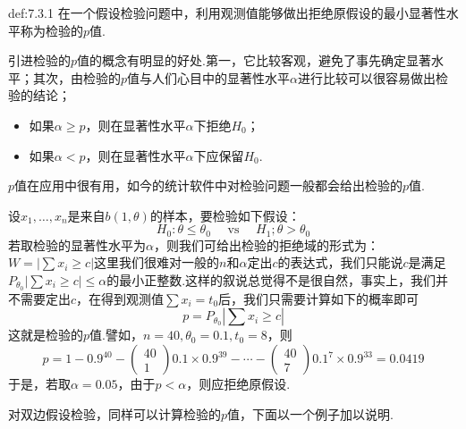 \begin{definition}{}{def:7.3.1}
	在一个假设检验问题中，利用观测值能够做出拒绝原假设的最小显著性水平称为检验的$p$值.
\end{definition}
引进检验的$p$值的概念有明显的好处.第一，它比较客观，避免了事先确定显著水平；其次，由检验的$p$值与人们心目中的显著性水平$\alpha$进行比较可以很容易做出检验的结论；
\begin{itemize}
	\item 如果$\alpha\geq p$，则在显著性水平$\alpha$下拒绝$H_{0}$；
	\item 如果$\alpha<p$，则在显著性水平$\alpha$下应保留$H_{0}$.
\end{itemize}
$p$值在应用中很有用，如今的统计软件中对检验问题一般都会给出检验的$p$值.
\begin{example}\label{exam7.3.6}
	设$x_{1},\dotsc,x_{n}$是来自$b(1,\theta)$的样本，要检验如下假设：
	\[H _ { 0 } : \theta \leq \theta _ { 0 } \quad \text { vs } \quad H _ { 1 } ; \theta > \theta _ { 0 }\]
	若取检验的显著性水平为$\alpha$，则我们可给出检验的拒绝域的形式为：$W=\left|\sum{x_i\geq c}\right|$这里我们很难对一般的$n$和$\alpha$定出$c$的表达式，我们只能说$c$是满足$P_{\theta_0}\left|\sum{x_i\geq c}\right|\leq\alpha $的最小正整数.这样的叙说总觉得不是很自然，事实上，我们并不需要定出$c$，在得到观测值$\sum x _ { i } = t _ { 0 }$后，我们只需要计算如下的概率即可
	\[
	p=P_{\theta_0}\left|\sum{x_i\geq c}\right|
	\]
	这就是检验的$p$值.譬如，$n=40,\theta_{ 0 }=0.1,t_{0}=8$，则
	\[p = 1 - 0.9 ^ { 40 } - \left( \begin{array} { c } { 40 } \\ { 1 } \end{array} \right) 0.1 \times 0.9 ^ { 39 } - \cdots - \left( \begin{array} { c } { 40 } \\ { 7 } \end{array} \right) 0.1 ^ { 7 } \times 0.9 ^ { 33 } = 0.0419\]
	于是，若取$\alpha=0.05$，由于$p<\alpha$，则应拒绝原假设.
	\end{example}
对双边假设检验，同样可以计算检验的$p$值，下面以一个例子加以说明.

